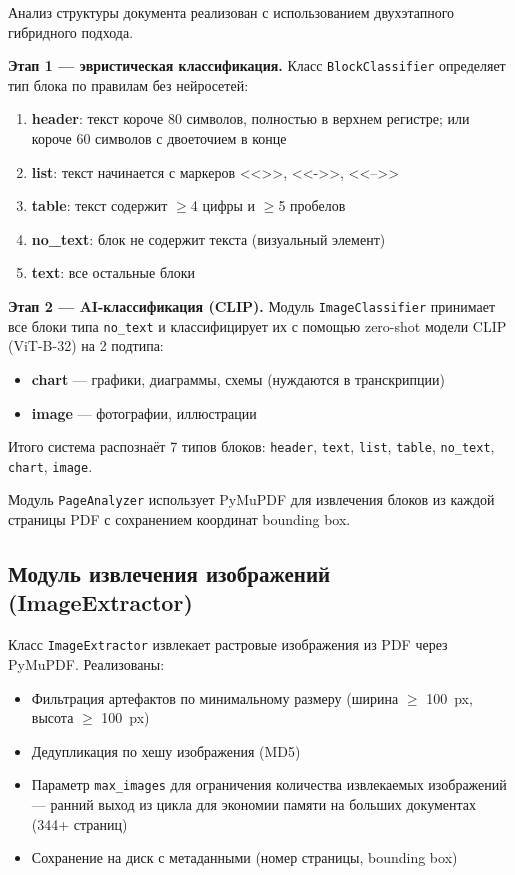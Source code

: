 \documentclass[a4paper,12pt]{article}
\begin{document}
Анализ структуры документа реализован с использованием двухэтапного гибридного подхода.

\textbf{Этап 1 --- эвристическая классификация.} Класс \texttt{BlockClassifier} определяет тип блока по правилам без нейросетей:

\begin{enumerate}
    \item \textbf{header}: текст короче 80 символов, полностью в верхнем регистре; или короче 60 символов с двоеточием в конце
    \item \textbf{list}: текст начинается с маркеров <<\textbullet>>, <<->>, <<-->>
    \item \textbf{table}: текст содержит $\geq$4 цифры и $\geq$5 пробелов
    \item \textbf{no\_text}: блок не содержит текста (визуальный элемент)
    \item \textbf{text}: все остальные блоки
\end{enumerate}

\textbf{Этап 2 --- AI-классификация (CLIP).} Модуль \texttt{ImageClassifier} принимает все блоки типа \texttt{no\_text} и классифицирует их с помощью zero-shot модели CLIP (ViT-B-32) на 2 подтипа:
\begin{itemize}
    \item \textbf{chart} --- графики, диаграммы, схемы (нуждаются в транскрипции)
    \item \textbf{image} --- фотографии, иллюстрации
\end{itemize}

Итого система распознаёт 7 типов блоков: \texttt{header}, \texttt{text}, \texttt{list}, \texttt{table}, \texttt{no\_text}, \texttt{chart}, \texttt{image}.

Модуль \texttt{PageAnalyzer} использует PyMuPDF для извлечения блоков из каждой страницы PDF с сохранением координат bounding box.

\subsection{Модуль извлечения изображений (ImageExtractor)}

Класс \texttt{ImageExtractor} извлекает растровые изображения из PDF через PyMuPDF. Реализованы:
\begin{itemize}
    \item Фильтрация артефактов по минимальному размеру (ширина $\geq$ 100~px, высота $\geq$ 100~px)
    \item Дедупликация по хешу изображения (MD5)
    \item Параметр \texttt{max\_images} для ограничения количества извлекаемых изображений --- ранний выход из цикла для экономии памяти на больших документах (344+ страниц)
    \item Сохранение на диск с метаданными (номер страницы, bounding box)
\end{itemize}
\end{document}
